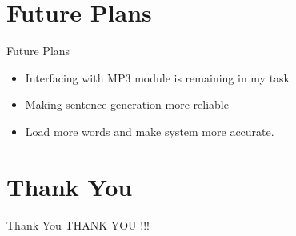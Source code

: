 \documentclass[10pt, a4paper]{beamer}
\begin{document}
\section{Future Plans}
\begin{frame}{Future Plans}
	\begin{itemize}
		\item Interfacing with MP3 module is remaining in my task
		\item Making sentence generation more reliable
		\item Load more words and make system more accurate.
	\end{itemize}
\end{frame}


\section{Thank You}
\begin{frame}{Thank You}
	\centering THANK YOU !!!
\end{frame}
\end{document}
